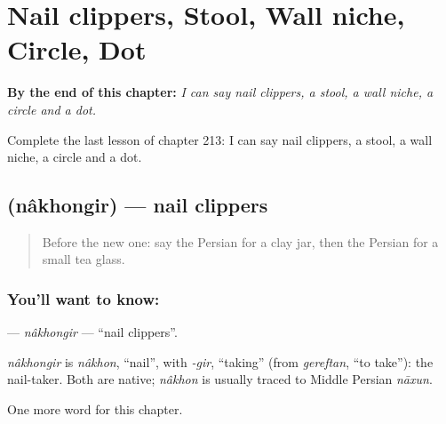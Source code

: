 
\chapter{Nail clippers, Stool, Wall niche, Circle, Dot}
\label{ch:fa-nail-clippers-stool-wall-niche-circle-dot}

\begin{chapteropening}
\textbf{By the end of this chapter:} \emph{I can say nail clippers, a stool, a wall niche, a circle and a dot.}

Complete the last lesson of chapter 213: I can say nail clippers, a stool, a wall niche, a circle and a dot.
\end{chapteropening}

\section[\texorpdfstring{\fa{ناخنگیر} (nâkhongir)}{ناخنگیر (nâkhongir)}]{ (nâkhongir) — nail clippers}

\label{lesson:FA-C213-nakhongir}



\begin{quote}
Before the new one: say the Persian for a clay jar, then the Persian for a small tea glass.
\end{quote}

\subsection*{You'll want to know: }
\textbf{} — \emph{nâkhongir} — \textquotedblleft{}nail clippers\textquotedblright{}.

\begin{cousinweb}
\emph{nâkhongir} is \emph{nâkhon}, \textquotedblleft{}nail\textquotedblright{}, with \emph{-gir}, \textquotedblleft{}taking\textquotedblright{} (from \emph{gereftan}, \textquotedblleft{}to take\textquotedblright{}): the nail-taker. Both are native; \emph{nâkhon} is usually traced to Middle Persian \emph{nāxun}.
\end{cousinweb}

\begin{grammarlens}[title={What you've built}]
One more word for this chapter.
\end{grammarlens}

